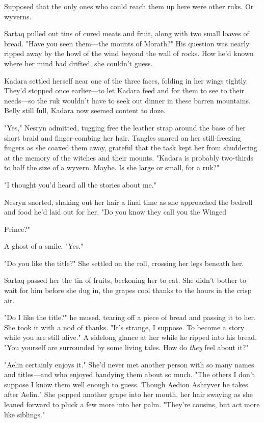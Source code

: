 Supposed that the only ones who could reach them up here were other ruks. Or wyverns.

Sartaq pulled out tins of cured meats and fruit, along with two small loaves of bread. "Have you seen them---the mounts of Morath?" His question was nearly ripped away by the howl of the wind beyond the wall of rocks. How he'd known where her mind had drifted, she couldn't guess.

Kadara settled herself near one of the three faces, folding in her wings tightly. They'd stopped once earlier---to let Kadara feed and for them to see to their needs---so the ruk wouldn't have to seek out dinner in these barren mountains. Belly still full, Kadara now seemed content to doze.

"Yes," Nesryn admitted, tugging free the leather strap around the base of her short braid and finger-combing her hair. Tangles snared on her still-freezing fingers as she coaxed them away, grateful that the task kept her from shuddering at the memory of the witches and their mounts. "Kadara is probably two-thirds to half the size of a wyvern. Maybe. Is she large or small, for a ruk?"

"I thought you'd heard all the stories about me."

Nesryn snorted, shaking out her hair a final time as she approached the bedroll and food he'd laid out for her. "Do you know they call you the Winged

Prince?"

A ghost of a smile. "Yes."

"Do you like the title?" She settled on the roll, crossing her legs beneath her.

Sartaq passed her the tin of fruits, beckoning her to eat. She didn't bother to wait for him before she dug in, the grapes cool thanks to the hours in the crisp air.

"Do I like the title?" he mused, tearing off a piece of bread and passing it to her. She took it with a nod of thanks. "It's strange, I suppose. To become a story while you are still alive." A sidelong glance at her while he ripped into his bread. "You yourself are surrounded by some living tales. How do \emph{they} feel about it?"

"Aelin certainly enjoys it." She'd never met another person with so many names and titles---and who enjoyed bandying them about so much. "The others  I don't suppose I know them well enough to guess. Though Aedion Ashryver  he takes after Aelin." She popped another grape into her mouth, her hair swaying as she leaned forward to pluck a few more into her palm. "They're cousins, but act more like siblings."


